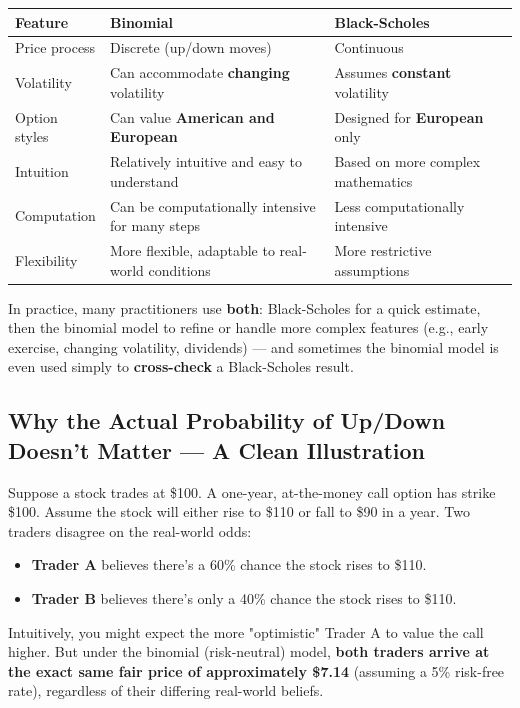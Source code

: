 \documentclass[12pt,openany]{book}
\theoremstyle{definition}
\theoremstyle{remark}
\begin{document}
{\small
\begin{longtable}{@{}L{0.18\textwidth}L{0.34\textwidth}L{0.38\textwidth}@{}}
\toprule
\textbf{Feature} & \textbf{Binomial} & \textbf{Black-Scholes} \\
\midrule
Price process & Discrete (up/down moves) & Continuous \\
Volatility & Can accommodate \textbf{changing} volatility & Assumes \textbf{constant} volatility \\
Option styles & Can value \textbf{American and European} & Designed for \textbf{European} only \\
Intuition & Relatively intuitive and easy to understand & Based on more complex mathematics \\
Computation & Can be computationally intensive for many steps & Less computationally intensive \\
Flexibility & More flexible, adaptable to real-world conditions & More restrictive assumptions \\
\bottomrule
\end{longtable}
}

In practice, many practitioners use \textbf{both}: Black-Scholes for a quick estimate, then the binomial model to refine or handle more complex features (e.g., early exercise, changing volatility, dividends) — and sometimes the binomial model is even used simply to \textbf{cross-check} a Black-Scholes result.

\subsection{Why the Actual Probability of Up/Down Doesn't Matter — A Clean Illustration}

Suppose a stock trades at \$100. A one-year, at-the-money call option has strike \$100. Assume the stock will either rise to \$110 or fall to \$90 in a year. Two traders disagree on the real-world odds:
\begin{itemize}
\item \textbf{Trader A} believes there's a 60\% chance the stock rises to \$110.
\item \textbf{Trader B} believes there's only a 40\% chance the stock rises to \$110.
\end{itemize}
Intuitively, you might expect the more "optimistic" Trader A to value the call higher. But under the binomial (risk-neutral) model, \textbf{both traders arrive at the exact same fair price of approximately \$7.14} (assuming a 5\% risk-free rate), regardless of their differing real-world beliefs.
\end{document}
